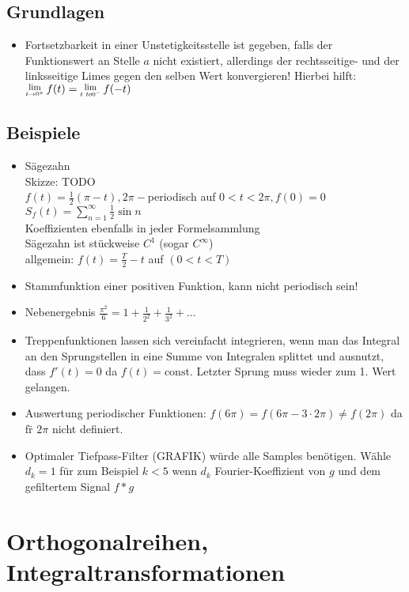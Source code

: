 \documentclass[nocolor,german]{latex4ei/latex4ei_sheet}
\newcommand{\Lim}[1]{\raisebox{0.5ex}{\scalebox{0.8}{$\displaystyle \lim_{#1    }\;$}}}
\begin{document}
\subsection{Grundlagen}
	\begin{itemize}
		\item Fortsetzbarkeit in einer Unstetigkeitsstelle ist gegeben, falls der Funktionswert an Stelle $a$ nicht existiert, allerdings der rechtsseitige- und der linksseitige Limes gegen den selben Wert konvergieren! Hierbei hilft:\\
			$\Lim{t \to 0^+} f(t) = \Lim{t\ to 0^-} f(-t)$
	\end{itemize}
	
\subsection*{Beispiele}
\begin{itemize}
	\item S\"agezahn\\
		Skizze: TODO\\
		$f(t)=\frac{1}{2}(\pi - t), 2 \pi-$periodisch auf $0<t<2 \pi, f(0)=0$\\
		$S_f(t)=\sum_{n=1}^\infty \frac{1}{2} \sin{n}$\\
		Koeffizienten ebenfalls in jeder Formelsammlung\\
		S\"agezahn ist st\"uckweise $C^1$ (sogar $C^\infty$)\\
		allgemein: $f(t)=\frac{T}{2}-t$ auf $(0 < t < T)$
	\item Stammfunktion einer positiven Funktion, kann nicht periodisch sein!
	\item Nebenergebnis $\frac{\pi^2}{6}=1+\frac{1}{2^2}+\frac{1}{3^2}+\ldots$
	\item Treppenfunktionen lassen sich vereinfacht integrieren, wenn man das Integral an den Sprungstellen in eine Summe von Integralen splittet und ausnutzt, dass $f'(t)=0$ da $f(t)=\mathrm{const}$. Letzter Sprung muss wieder zum 1. Wert gelangen.
	\item Auswertung periodischer Funktionen: $f(6\pi)=f(6\pi-3 \cdot 2 \pi)\neq f(2\pi)$ da f\"r $2 \pi$ nicht definiert.
	\item Optimaler Tiefpass-Filter (GRAFIK) w\"urde alle Samples ben\"otigen. W\"ahle $d_k=1$ f\"ur zum Beispiel $k<5$ wenn $d_k$ Fourier-Koeffizient von $g$ und dem gefiltertem Signal $f \ast g$
\end{itemize}
\section{Orthogonalreihen, Integraltransformationen}
\end{document}
